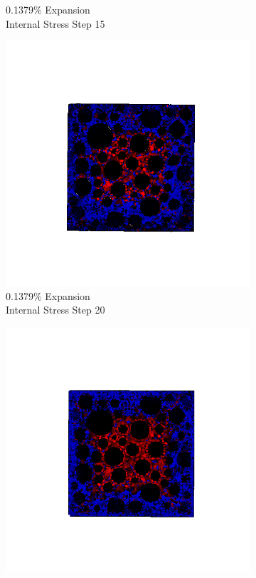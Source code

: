 \begin{figure}[h!]
\begin{subfigure}{.25\textwidth}
      \caption{0.1379\% Expansion\\Internal Stress Step 15}
    \end{subfigure}%
    \begin{subfigure}{.25\textwidth}
      \centering
      \includegraphics[width=1.0\linewidth]{Files/exp_3D/DEF/A30X0C_1_stress.png}
      \caption{0.1379\% Expansion\\Internal Stress Step 20}
    \end{subfigure}
    \begin{subfigure}{.25\textwidth}
      \centering
      \includegraphics[width=1.0\linewidth]{Files/exp_3D/DEF/A30X0C_2_s5.png}

\end{subfigure}
\end{figure}
